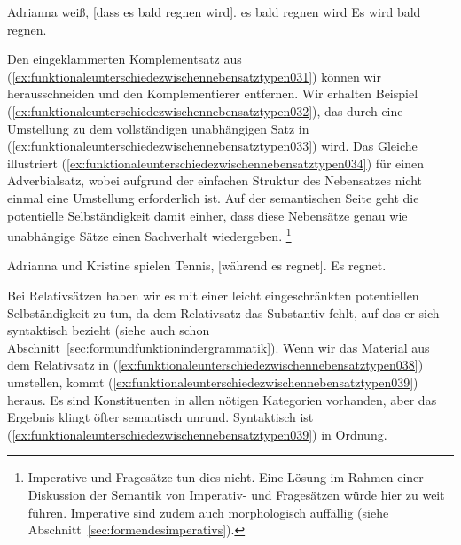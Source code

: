 \begin{exe}
  \ex\label{ex:funktionaleunterschiedezwischennebensatztypen030}
  \begin{xlist}
    \ex\label{ex:funktionaleunterschiedezwischennebensatztypen031} Adrianna weiß, [dass es bald regnen wird].
    \ex\label{ex:funktionaleunterschiedezwischennebensatztypen032} es bald regnen wird
    \ex\label{ex:funktionaleunterschiedezwischennebensatztypen033} Es wird bald regnen.
  \end{xlist}
\end{exe}

Den eingeklammerten Komplementsatz aus (\ref{ex:funktionaleunterschiedezwischennebensatztypen031}) können wir herausschneiden und den Komplementierer entfernen.
Wir erhalten Beispiel (\ref{ex:funktionaleunterschiedezwischennebensatztypen032}), das durch eine Umstellung zu dem vollständigen unabhängigen Satz in (\ref{ex:funktionaleunterschiedezwischennebensatztypen033}) wird.
Das Gleiche illustriert (\ref{ex:funktionaleunterschiedezwischennebensatztypen034}) für einen Adverbialsatz, wobei aufgrund der einfachen Struktur des Nebensatzes nicht einmal eine Umstellung erforderlich ist.
Auf der semantischen Seite geht die potentielle Selbständigkeit damit einher, dass diese Nebensätze genau wie unabhängige Sätze einen Sachverhalt wiedergeben.%
\footnote{Imperative und Fragesätze tun dies nicht.
Eine Lösung im Rahmen einer Diskussion der Semantik von Imperativ- und Fragesätzen würde hier zu weit führen.
Imperative sind zudem auch morphologisch auffällig (siehe Abschnitt~\ref{sec:formendesimperativs}).}

\begin{exe}
  \ex\label{ex:funktionaleunterschiedezwischennebensatztypen034}
  \begin{xlist}
    \ex\label{ex:funktionaleunterschiedezwischennebensatztypen035} Adrianna und Kristine spielen Tennis, [während es regnet].
    \ex\label{ex:funktionaleunterschiedezwischennebensatztypen036} Es regnet.
  \end{xlist}
\end{exe}

Bei Relativsätzen haben wir es mit einer leicht eingeschränkten potentiellen Selbständigkeit zu tun, da dem Relativsatz das Substantiv fehlt, auf das er sich syntaktisch bezieht (siehe auch schon Abschnitt~\ref{sec:formundfunktionindergrammatik}).
Wenn wir das Material aus dem Relativsatz in (\ref{ex:funktionaleunterschiedezwischennebensatztypen038}) umstellen, kommt (\ref{ex:funktionaleunterschiedezwischennebensatztypen039}) heraus.
Es sind Konstituenten in allen nötigen Kategorien vorhanden, aber das Ergebnis klingt öfter semantisch unrund.
Syntaktisch ist (\ref{ex:funktionaleunterschiedezwischennebensatztypen039}) in Ordnung.

